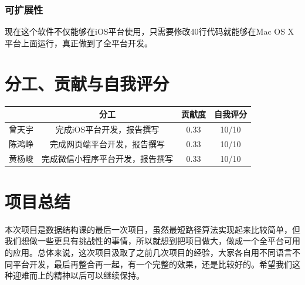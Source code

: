 \documentclass[12pt,UTF8]{ctexart}
\begin{document}
\begin{spacing}{1.4}
\subsubsection{可扩展性}
现在这个软件不仅能够在iOS平台使用，只需要修改40行代码就能够在Mac OS X平台上面运行，真正做到了全平台开发。

\section{分工、贡献与自我评分}
\begin{table}[H]
	\centering
	\begin{tabular}{|c|c|c|c|}
		\hline
		& 分工 & 贡献度 & 自我评分\\
		\hline
		曾天宇 &  完成iOS平台开发，报告撰写 & 0.33 & 10/10\\
		陈鸿峥 &  完成网页端平台开发，报告撰写 & 0.33 & 10/10\\
		黄杨峻 &  完成微信小程序平台开发，报告撰写 & 0.33 & 10/10\\
		\hline
	\end{tabular}
\end{table}

\section{项目总结}
本次项目是数据结构课的最后一次项目，虽然最短路径算法实现起来比较简单，但我们想做一些更具有挑战性的事情，所以就想到把项目做大，做成一个全平台可用的应用。总体来说，这次项目汲取了之前几次项目的经验，大家各自用不同语言不同平台开发，最后再整合再一起，有一个完整的效果，还是比较好的。希望我们这种迎难而上的精神以后可以继续保持。

\end{spacing}

%	
\end{document}
